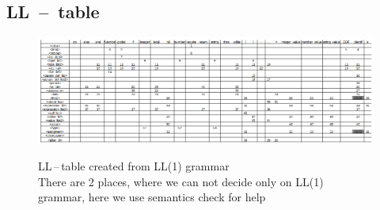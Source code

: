 \documentclass[11pt]{article}
\begin{document}
\begin{landscape}
    \section{LL\ --\ table}
    \begin{figure}[ht]
        \includegraphics[scale=1.89]{LL_tabulka.eps} 
        \label{LL-table}
        \caption{LL\,--\,table  created from LL(1) grammar\\There are 2 places, where we can not decide only on LL(1) grammar, here we use semantics check for help}
    \end{figure}
\end{landscape}





\end{document}
